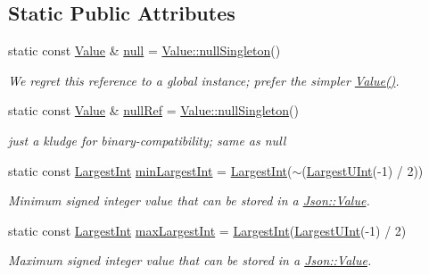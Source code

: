 \subsection*{Static Public Attributes}
\begin{DoxyCompactItemize}
\item 
static const \hyperlink{class_json_1_1_value}{Value} \& \hyperlink{class_json_1_1_value_a0fb5f64cef1500c21b70c82c79ae742d}{null} = \hyperlink{class_json_1_1_value_af2f124567acc35d021a424e53ebdfcab}{Value\+::null\+Singleton}()
\begin{DoxyCompactList}\small\item\em We regret this reference to a global instance; prefer the simpler \hyperlink{class_json_1_1_value_ada6ba1369448fb0240bccc36efaa46f7}{Value()}. \end{DoxyCompactList}\item 
static const \hyperlink{class_json_1_1_value}{Value} \& \hyperlink{class_json_1_1_value_a2c2e7ac82f7dd775ed6eee37903d53c6}{null\+Ref} = \hyperlink{class_json_1_1_value_af2f124567acc35d021a424e53ebdfcab}{Value\+::null\+Singleton}()
\begin{DoxyCompactList}\small\item\em just a kludge for binary-\/compatibility; same as null \end{DoxyCompactList}\item 
static const \hyperlink{class_json_1_1_value_a1cbb82642ed05109b9833e49f042ece7}{Largest\+Int} \hyperlink{class_json_1_1_value_a012028a98f360f6e02475baa4e48175e}{min\+Largest\+Int} = \hyperlink{class_json_1_1_value_a1cbb82642ed05109b9833e49f042ece7}{Largest\+Int}($\sim$(\hyperlink{class_json_1_1_value_a6682a3684d635e03fc06ba229fa24eec}{Largest\+U\+Int}(-\/1) / 2))
\begin{DoxyCompactList}\small\item\em Minimum signed integer value that can be stored in a \hyperlink{class_json_1_1_value}{Json\+::\+Value}. \end{DoxyCompactList}\item 
static const \hyperlink{class_json_1_1_value_a1cbb82642ed05109b9833e49f042ece7}{Largest\+Int} \hyperlink{class_json_1_1_value_ad0396ec8811ace1287005f372f5edbf8}{max\+Largest\+Int} = \hyperlink{class_json_1_1_value_a1cbb82642ed05109b9833e49f042ece7}{Largest\+Int}(\hyperlink{class_json_1_1_value_a6682a3684d635e03fc06ba229fa24eec}{Largest\+U\+Int}(-\/1) / 2)
\begin{DoxyCompactList}\small\item\em Maximum signed integer value that can be stored in a \hyperlink{class_json_1_1_value}{Json\+::\+Value}. \end{DoxyCompactList}\item 

\end{DoxyCompactItemize}
